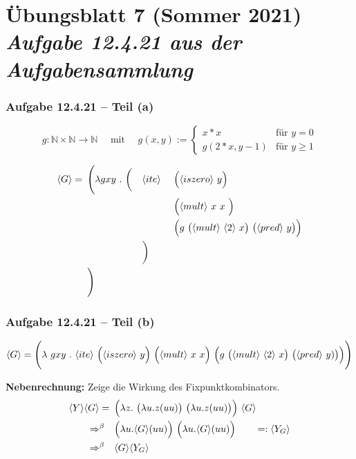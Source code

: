 \documentclass{beamer}
\newcommand{\num}[1]{\ensuremath{\langle #1 \rangle}}
\begin{document}
\section{Übungsblatt 7 (Sommer 2021) \\ \textit{\normalsize Aufgabe 12.4.21 aus der Aufgabensammlung}}

\begin{frame} \frametitle{Aufgabe 12.4.21 -- Teil (a)}
	\small
	\begin{equation*}
		g \colon \mathbb{N} \times \mathbb{N} \to \mathbb{N} \quad \text{ mit } \quad g(x,y) := \begin{cases}
		x * x & \text{für } y=0 \\
		g(2*x,y-1) & \text{für } y \ge 1 
		\end{cases}
	\end{equation*}
	
	\medskip
	
	\begin{alignat*}{3}
		\num{G} = \enskip & \Biggl( \lambda g xy \ . \ \biggl( &&\num{ite} \ && \Bigl( \num{iszero} \ y \Bigr) \\
		&&&&& \Bigl( \num{mult} \ x \ x \ \Bigr) \\
		&&&&& \Bigl( g \ \bigl( \num{mult} \ \num{2} \ x \bigr) \ \bigl( \num{pred} \ y \bigr) \Bigr) \\
		&&& \biggr) \\
		& \Biggr)
	\end{alignat*}
\end{frame}

\begin{frame} \frametitle{Aufgabe 12.4.21 -- Teil (b)}
	\footnotesize
	\begin{equation*}
		\num{G} = \Biggl( \lambda \ g xy \ . \ \num{ite} \ \Bigl(\num{iszero} \ y \Bigr) \ \Bigl( \num{mult} \ x \ x \Bigr) \ \Bigl( g \ \bigl( \num{mult} \ \num{2} \ x \bigr) \ \bigl(\num{pred} \ y) \bigr) \Bigr) \Biggr)
	\end{equation*}
	
	\bigskip 
	\normalsize
	
	\textbf{Nebenrechnung:} Zeige die Wirkung des Fixpunktkombinators.
	\begin{align*}
		\num{Y} \num{G}
		= \enskip &\Bigl( \lambda z . \ \bigl( \lambda u . z (uu) \bigr) \ \bigl( \lambda u. z (uu) \bigr) \Bigr) \ \num{G} \\
		\Rightarrow^{\beta} \quad &\Bigl( \lambda u . \num{G} (uu) \Bigr) \ \Bigl( \lambda u. \num{G} (uu) \Bigr) \qquad =: \num{Y_G} \\
		\Rightarrow^{\beta} \quad &\num{G} \num{Y_G}
	\end{align*}
\end{frame}
\end{document}
